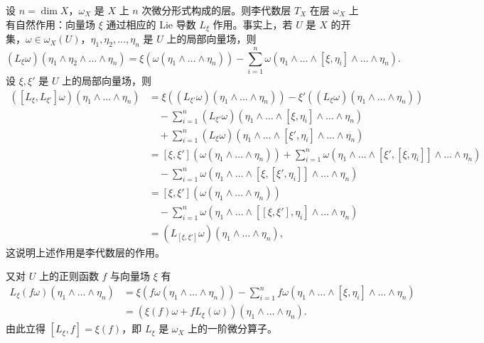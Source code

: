 设 $n=\dim X$，$\omega_X$ 是 $X$ 上 $n$ 次微分形式构成的层。则李代数层 $T_X$ 在层 $\omega_X$ 上有自然作用：向量场 $\xi$ 通过相应的 Lie 导数 $L_\xi$ 作用。事实上，若 $U$ 是 $X$ 的开集，$\omega\in\omega_X(U)$，$\eta_1,\eta_2,\dots,\eta_n$ 是 $U$ 上的局部向量场，则
$$(L_\xi\omega)(\eta_1\wedge\eta_2\wedge\dots\wedge\eta_n)=\xi(\omega(\eta_1\wedge\dots\wedge\eta_n))-\sum_{i=1}^n\omega(\eta_1\wedge\dots\wedge[\xi,\eta_i]\wedge\dots\wedge\eta_n).$$
设 $\xi,\xi'$ 是 $U$ 上的局部向量场，则
{\small
\begin{align*}
([L_\xi,L_{\xi'}]\omega)(\eta_1\wedge\dots\wedge\eta_n)&=\xi((L_{\xi'}\omega)(\eta_1\wedge\dots\wedge\eta_n))-\xi'((L_\xi\omega)(\eta_1\wedge\dots\wedge\eta_n))\\
&\quad-\sum_{i=1}^n(L_{\xi'}\omega)(\eta_1\wedge\dots\wedge[\xi,\eta_i]\wedge\dots\wedge\eta_n)\\
&\quad+\sum_{i=1}^n(L_\xi\omega)(\eta_1\wedge\dots\wedge[\xi',\eta_i]\wedge\dots\wedge\eta_n)\\
&=[\xi,\xi'](\omega(\eta_1\wedge\dots\wedge\eta_n))+\sum_{i=1}^n\omega(\eta_1\wedge\dots\wedge[\xi',[\xi,\eta_i]]\wedge\dots\wedge\eta_n)\\
&\quad-\sum_{i=1}^n\omega(\eta_1\wedge\dots\wedge[\xi,[\xi',\eta_i]]\wedge\dots\wedge\eta_n)\\
&=[\xi,\xi'](\omega(\eta_1\wedge\dots\wedge\eta_n))\\
&\quad-\sum_{i=1}^n\omega(\eta_1\wedge\dots\wedge[[\xi,\xi'],\eta_i]\wedge\dots\wedge\eta_n)\\
&=(L_{[\xi,\xi']}\omega)(\eta_1\wedge\dots\wedge\eta_n),
\end{align*}
}
这说明上述作用是李代数层的作用。

又对 $U$ 上的正则函数 $f$ 与向量场 $\xi$ 有
\begin{align*}
L_\xi(f\omega)(\eta_1\wedge\dots\wedge\eta_n)&=\xi(f\omega(\eta_1\wedge\dots\wedge\eta_n))-\sum_{i=1}^n f\omega(\eta_1\wedge\dots\wedge[\xi,\eta_i]\wedge\dots\wedge\eta_n)\\
&=(\xi(f)\omega+fL_\xi(\omega))(\eta_1\wedge\dots\wedge\eta_n).
\end{align*}
由此立得 $[L_\xi,f]=\xi(f)$，即 $L_\xi$ 是 $\omega_X$ 上的一阶微分算子。

